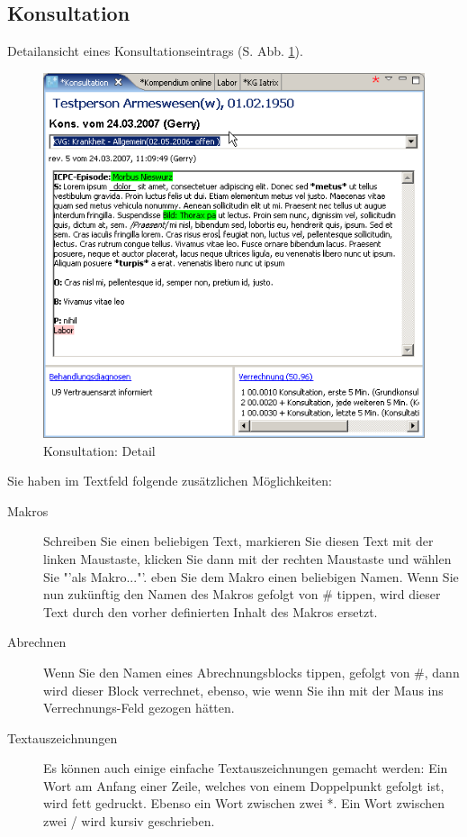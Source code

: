 \subsection{Konsultation}
 \label{konsview}
Detailansicht eines Konsultationseintrags (S. Abb. \ref{fig:konsdetail}).
\begin{figure}[htp]
\begin{center}
  \includegraphics{images/konsview}
  \caption{Konsultation: Detail}
  \label{fig:konsdetail}
\end{center}
\end{figure}

Sie haben im Textfeld folgende zusätzlichen Möglichkeiten:
\begin{description}
\item[Makros]
Schreiben Sie einen beliebigen Text, markieren Sie diesen Text mit der linken Maustaste, klicken Sie dann mit der rechten Maustaste und wählen Sie "'als Makro..."'. eben Sie dem Makro einen beliebigen Namen. Wenn Sie nun zukünftig den Namen des Makros gefolgt von \# tippen, wird dieser Text durch den vorher definierten Inhalt des Makros ersetzt.

\item[Abrechnen]
Wenn Sie den Namen eines Abrechnungsblocks tippen, gefolgt von \#, dann wird dieser Block verrechnet, ebenso, wie wenn Sie ihn mit der Maus ins Verrechnungs-Feld gezogen hätten.

\item[Textauszeichnungen]
Es können auch einige einfache Textauszeichnungen gemacht werden: Ein Wort am Anfang einer Zeile, welches von einem Doppelpunkt gefolgt ist, wird fett gedruckt. Ebenso ein Wort zwischen zwei *. Ein Wort zwischen zwei / wird kursiv geschrieben.
\end{description}


